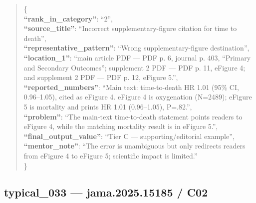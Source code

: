\documentclass[
  letterpaper,
  9pt]{extreport}
\begin{document}
\begin{quote}
\{\\
\textbf{``rank\_in\_category''}: ``2'',\\
\textbf{``source\_title''}: ``Incorrect supplementary-figure citation
for time to death'',\\
\textbf{``representative\_pattern''}: ``Wrong supplementary-figure
destination'',\\
\textbf{``location\_1''}: ``main article PDF --- PDF p. 6, journal p.
403, ``Primary and Secondary Outcomes''; supplement 2 PDF --- PDF p. 11,
eFigure 4; and supplement 2 PDF --- PDF p. 12, eFigure 5.'',\\
\textbf{``reported\_numbers''}: ``Main text: time-to-death HR 1.01 (95\%
CI, 0.96--1.05), cited as eFigure 4. eFigure 4 is oxygenation (N=2489);
eFigure 5 is mortality and prints HR 1.01 (0.96--1.05), P=.82.'',\\
\textbf{``problem''}: ``The main-text time-to-death statement points
readers to eFigure 4, while the matching mortality result is in eFigure
5.'',\\
\textbf{``final\_output\_value''}: ``Tier C --- supporting/editorial
example'',\\
\textbf{``mentor\_note''}: ``The error is unambiguous but only redirects
readers from eFigure 4 to eFigure 5; scientific impact is limited.''\\
\}
\end{quote}

\hypertarget{typical_033--jama202515185--c02}{%
\subsection{typical\_033 --- jama.2025.15185 /
C02}\label{typical_033--jama202515185--c02}}
\end{document}
